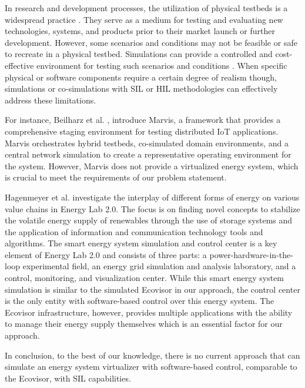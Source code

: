 In research and development processes, the utilization of physical testbeds is a
widespread practice \cite{cintuglu2017, mambretti2015}. They serve as a medium
for testing and evaluating new technologies, systems, and products prior to
their market launch or further development. However, some scenarios and
conditions may not be feasible or safe to recreate in a physical testbed.
Simulations can provide a controlled and cost-effective environment for testing
such scenarios and conditions \cite{mansouri2020}. When specific physical or
software components require a certain degree of realism though, simulations or
co-simulations with SIL or HIL methodologies can effectively address these
limitations.

For instance, Beilharz et al. \cite{beilharz2021}, introduce Marvis, a framework
that provides a comprehensive staging environment for testing distributed IoT
applications. Marvis orchestrates hybrid testbeds, co-simulated domain
environments, and a central network simulation to create a representative
operating environment for the system. However, Marvis does not provide a
virtualized energy system, which is crucial to meet the requirements of our
problem statement.

Hagenmeyer et al. \cite{hagenmeyer2016} investigate the interplay of different
forms of energy on various value chains in Energy Lab 2.0. The focus is on
finding novel concepts to stabilize the volatile energy supply of renewables
through the use of storage systems and the application of information and
communication technology tools and algorithms. The smart energy system
simulation and control center is a key element of Energy Lab 2.0 and consists of
three parts: a power-hardware-in-the-loop experimental field, an energy grid
simulation and analysis laboratory, and a control, monitoring, and visualization
center. While this smart energy system simulation is similar to the simulated
Ecovisor in our approach, the control center is the only entity with
software-based control over this energy system. The Ecovisor infrastructure,
however, provides multiple applications with the ability to manage their energy
supply themselves which is an essential factor for our approach.

In conclusion, to the best of our knowledge, there is no current approach that
can simulate an energy system virtualizer with software-based control,
comparable to the Ecovisor, with SIL capabilities.
